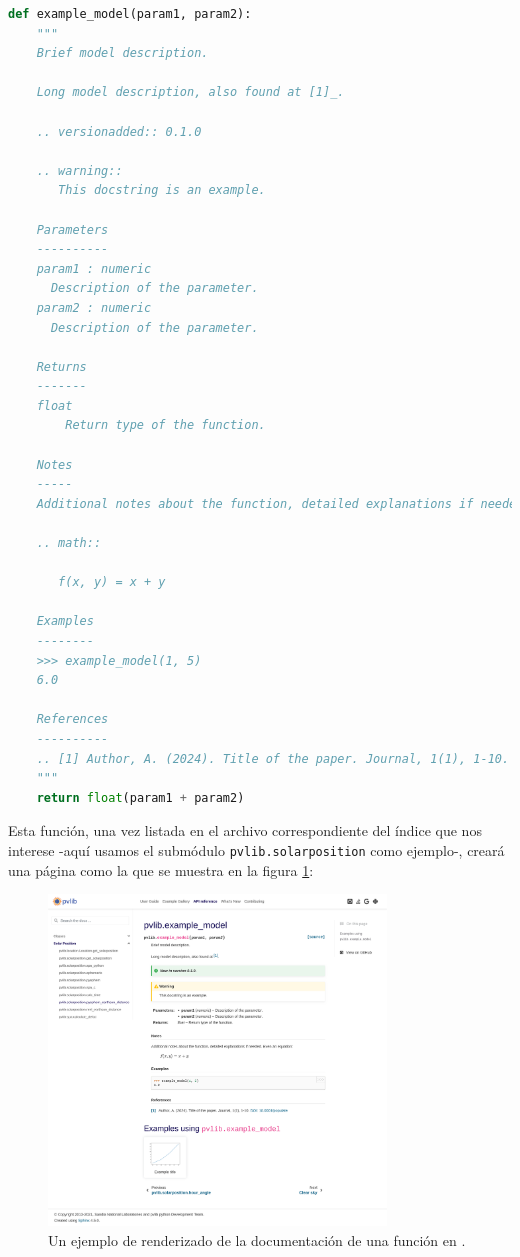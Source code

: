 \begin{lstlisting}[language=Python, caption={Ejemplo de documentación de una función en \pvlibpy{}.}, label={lst:doc_function_example}]
def example_model(param1, param2):
    """
    Brief model description.

    Long model description, also found at [1]_.

    .. versionadded:: 0.1.0

    .. warning::
       This docstring is an example.

    Parameters
    ----------
    param1 : numeric
      Description of the parameter.
    param2 : numeric
      Description of the parameter.

    Returns
    -------
    float
        Return type of the function.

    Notes
    -----
    Additional notes about the function, detailed explanations if needed. Even an equation:

    .. math::

       f(x, y) = x + y

    Examples
    --------
    >>> example_model(1, 5)
    6.0

    References
    ----------
    .. [1] Author, A. (2024). Title of the paper. Journal, 1(1), 1-10. :doi:`10.0001/populate`
    """
    return float(param1 + param2)
\end{lstlisting}

Esta \gls{función}, una vez listada en el archivo correspondiente del índice que nos interese -aquí usamos el \gls{submódulo} \texttt{pvlib.solarposition} como ejemplo-, creará una página como la que se muestra en la figura \ref{fig:doc_function_example}:

\begin{figure}[H]
    \centering
    \includegraphics[width=0.8\textwidth]{./images/how_to_document/function_stretch.png}
    \caption{Un ejemplo de renderizado de la documentación de una función en \pvlibpy{}.}
    \label{fig:doc_function_example}
\end{figure}

